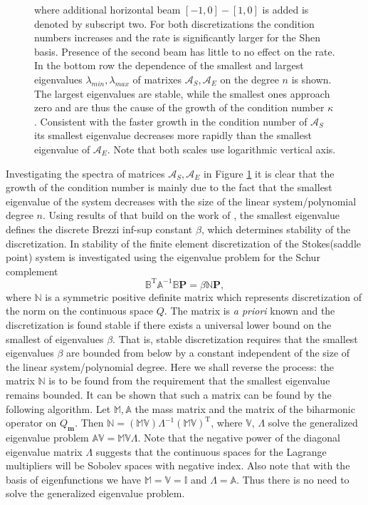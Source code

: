 \documentclass{marine_2015}
\newcommand{\Amat}{\ensuremath{\mathbb{A}}}
\newcommand{\Bmat}{\ensuremath{\mathbb{B}}}
\newcommand{\Pvec}{\ensuremath{\mathbf{P}}}
\newcommand{\Qh}{\ensuremath{Q_{\mathbf{m}}}}
\begin{document}
\begin{figure}[t!]
{ where additional horizontal beam $\left[-1, 0\right]-\left[1, 0\right]$ is added 
 is denoted by subscript two. For both discretizations the condition numbers
 increases and the rate is significantly larger for the Shen basis. Presence 
 of the second beam has little to no effect on the rate. In the bottom row the 
 dependence of the smallest and largest eigenvalues $\lambda_{min}, \lambda_{max}$ 
 of matrixes $\mathcal{A}_S, \mathcal{A}_E$ on the degree $n$ is shown.
 The largest eigenvalues are stable, while the smallest ones approach zero and are
 thus the cause of the growth of the condition number $\kappa$. Consistent with
 the faster growth in the condition number of $\mathcal{A}_S$ its smallest
 eigenvalue decreases more rapidly than the smallest eigenvalue of
 $\mathcal{A}_E$. Note that both scales use logarithmic vertical axis.}
 \label{fig:no_precon}
 \end{figure}

Investigating the spectra of matrices $\mathcal{A}_S, \mathcal{A}_E$ in Figure 
\ref{fig:no_precon} it is clear that the growth of the condition number is mainly 
due to the fact that the smallest eigenvalue of the system decreases with the size of the linear
system/polynomial degree $n$. Using results of \cite{marie} that build on the work 
of \cite{malkus}, the smallest eigenvalue defines the discrete Brezzi inf-sup 
constant $\beta$, which determines stability of the discretization. In \cite{marie} 
stability of the finite element discretization of the Stokes(saddle point) system 
is investigated using the eigenvalue problem for the Schur complement
\begin{equation}
  \label{eq:schur}
  \Bmat^{\text{T}}\Amat^{-1}\Bmat\Pvec = \beta\mathbb{N}\Pvec,
\end{equation}
where $\mathbb{N}$ is a symmetric positive definite matrix which
represents discretization of the norm on the continuous space $Q$. The matrix is
\textit{a priori} known and the discretization is found stable if there exists a
universal lower bound on the smallest of eigenvalues $\beta$. That is, stable
discretization requires that the smallest eigenvalues $\beta$ are bounded from
below by a constant independent of the size of the linear system/polynomial
degree. Here we shall reverse the process: the matrix $\mathbb{N}$ is to be found 
from the requirement that the smallest eigenvalue remains bounded. It can be 
shown that such a matrix can be found by the following algorithm. Let $\mathbb{M},
\mathbb{A}$ the mass matrix and the matrix of the biharmonic operator on $\Qh$.
Then
$\mathbb{N}=\left(\mathbb{M}\mathbb{V}\right){\Lambda}^{-1}\left(\mathbb{M}\mathbb{V}\right)^{\text{T}}$,
where $\mathbb{V}$, $\Lambda$ solve the generalized eigenvalue problem
$\mathbb{A}\mathbb{V}=\mathbb{M}\mathbb{V}\Lambda$. Note that the negative power 
of the diagonal eigenvalue matrix $\Lambda$ suggests that the continuous spaces 
for the Lagrange multipliers will be Sobolev spaces with negative index.
Also note that with the basis of eigenfunctions we have $\mathbb{M}=\mathbb{V}=\mathbb{I}$
and $\Lambda=\mathbb{A}$. Thus there is no need to solve the generalized
eigenvalue problem. 
\end{document}
